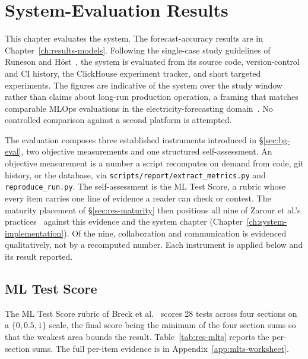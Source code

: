 
\chapter{System-Evaluation Results}
\label{ch:results-system}

This chapter evaluates the system. The forecast-accuracy results are in
Chapter~\ref{ch:results-models}. Following the single-case study guidelines of
Runeson and H\"ost~\cite{runeson2009casestudy}, the system is evaluated from its
source code, version-control and CI history, the ClickHouse experiment tracker,
and short targeted experiments. The figures are indicative of the system over
the study window rather than claims about long-run production operation, a
framing that matches comparable MLOps evaluations in the electricity-forecasting
domain~\cite{subramanya2022devops2mlops}. No controlled comparison against a
second platform is attempted.

The evaluation composes three established instruments introduced in
\S\ref{sec:bg-eval}, two objective measurements and one structured
self-assessment. An objective measurement is a number a script recomputes on
demand from code, git history, or the database, via
\texttt{scripts/report/extract\_metrics.py} and \texttt{reproduce\_run.py}. The
self-assessment is the ML Test Score, a rubric whose every item carries one line
of evidence a reader can check or contest. The maturity placement of
\S\ref{sec:res-maturity} then positions all nine of Zarour et al.'s
practices~\cite{zarour2025} against this evidence and the system chapter
(Chapter~\ref{ch:system-implementation}). Of the nine, collaboration and
communication is evidenced qualitatively, not by a recomputed number. Each
instrument is applied below and its result reported.

\section{ML Test Score}
\label{sec:res-mlts}

The ML Test Score rubric of Breck et al.~\cite{breck2017mltestscore} scores 28
tests across four sections on a $\{0, 0.5, 1\}$ scale, the final score being the
minimum of the four section sums so that the weakest area bounds the result.
Table~\ref{tab:res-mlts} reports the per-section sums. The full per-item evidence
is in Appendix~\ref{app:mlts-worksheet}.


